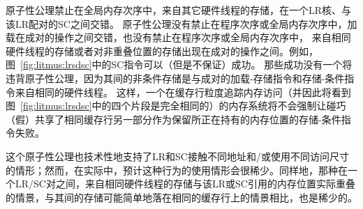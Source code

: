 原子性公理禁止在全局内存次序中，来自其它硬件线程的存储，在一个LR核、与该LR配对的SC之间交错。
原子性公理没有禁止在程序次序或全局内存次序中，加载在成对的操作之间交错，也没有禁止在程序次序或全局内存次序中，
来自相同硬件线程的存储或者对非重叠位置的存储出现在成对的操作之间。例如，图~\ref{fig:litmus:lrsdsc}中的SC指令可以（但是不保证）成功。
那些成功没有一个将违背原子性公理，因为其间的非条件存储是与成对的加载-存储指令和存储-条件指令来自相同的硬件线程。
这样，一个在缓存行粒度追踪内存访问（并因此将看到图~\ref{fig:litmus:lrsdsc}中的四个片段是完全相同的）的内存系统将不会强制让碰巧（假）共享了相同缓存行另一部分作为保留所正在持有的内存位置的存储-条件指令失败。

这个原子性公理也技术性地支持了LR和SC接触不同地址和/或使用不同访问尺寸的情形；然而，在实际中，预计这种行为的使用情形会很稀少。同样地，那种在一个LR/SC对之间，来自相同硬件线程的存储与该LR或SC引用的内存位置实际重叠的情景，与其间的存储可能简单地落在相同的缓存行上的情景相比，也是稀少的。

